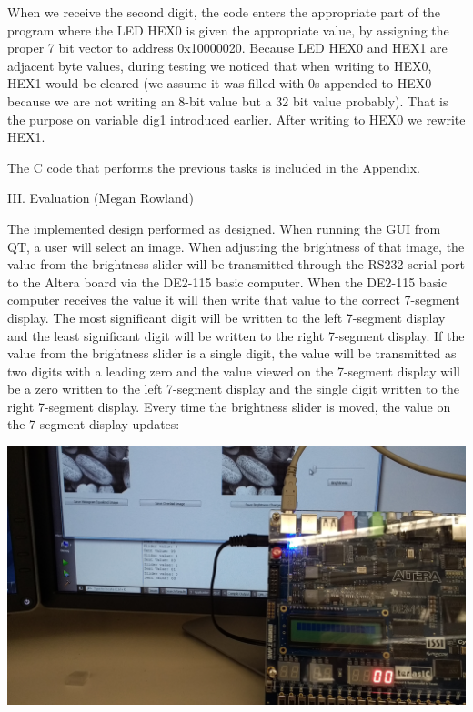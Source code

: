 \documentclass{article}
\newenvironment{Figure}
  {\par\medskip\noindent\ignorespaces\minipage{\linewidth}}
  {\endminipage\par\medskip}
\begin{document}
\begin{multicols*}{2}
	When we receive the second digit, the code enters the appropriate part of the program where the LED HEX0 is given the appropriate value, by assigning the proper 7 bit vector to address 0x10000020. Because LED HEX0 and HEX1 are adjacent byte values, during testing we noticed that when writing to HEX0, HEX1 would be cleared (we assume it was filled with 0s appended to HEX0 because we are not writing an 8-bit value but a 32 bit value probably). That is the purpose on variable dig1 introduced earlier. After writing to HEX0 we rewrite HEX1.

	The C code that performs the previous tasks is included in the Appendix.





\begin{center}
{\large III. Evaluation (Megan Rowland)}\\
\end{center}

The implemented design performed as designed. When running the GUI from QT, a user will select an image. When adjusting the brightness of that image, the value from the brightness slider will be transmitted through the RS232 serial port to the Altera board via the DE2-115 basic computer. When the DE2-115 basic computer receives the value it will then write that value to the correct 7-segment display. The most significant digit will be written to the left 7-segment display and the least significant digit will be written to the right 7-segment display. If the value from the brightness slider is a single digit, the value will be transmitted as two digits with a leading zero and the value viewed on the 7-segment display will be a zero written to the left 7-segment display and the single digit written to the right 7-segment display. Every time the brightness slider is moved, the value on the 7-segment display updates:

\begin{Figure}
 \centering
 \includegraphics[width=\linewidth]{display_00.JPG}
\end{Figure}


\end{multicols*}
\end{document}
